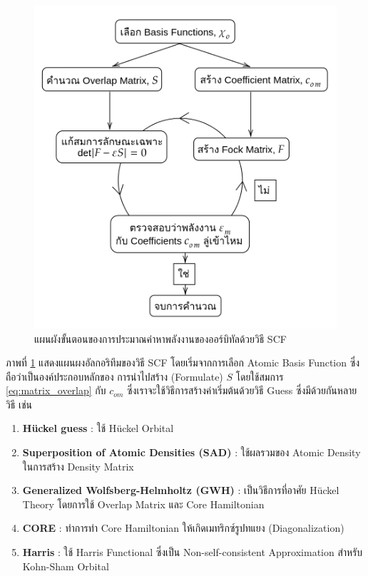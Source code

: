 \begin{figure}[htbp]
    \centering
    \includegraphics[width=0.9\linewidth]{fig/scf.png}
    \caption{แผนผังขั้นตอนของการประมาณค่าหาพลังงานของออร์บิทัลด้วยวิธี SCF}
    \label{fig:scf}
\end{figure}

ภาพที่ \ref{fig:scf} แสดงแผนผงอัลกอริทึมของวิธี SCF โดยเริ่มจากการเลือก Atomic Basis Function ซึ่งถือว่าเป็นองค์ประกอบหลักของ%
การนำไปสร้าง (Formulate) $S$ โดยใช้สมการ \ref{eq:matrix_overlap} กับ $c_{om}$ ซึ่งเราจะใช้วิธีการสร้างค่าเริ่มต้นด้วยวิธี Guess 
ซึ่งมีด้วยกันหลายวิธี เช่น

\begin{enumerate}[topsep=0pt]
    \item \textbf{H{\"u}ckel guess} : ใช้ H{\"u}ckel Orbital\autocite{jensen2017}
    
    \item \textbf{Superposition of Atomic Densities (SAD)} : ใช้ผลรวมของ Atomic Density ในการสร้าง Density Matrix
    
    \item \textbf{Generalized Wolfsberg-Helmholtz (GWH)} : เป็นวิธีการที่อาศัย H{\"u}ckel Theory โดยการใช้ Overlap 
    Matrix และ Core Hamiltonian\autocite{wolfsberg1952}
    
    \item \textbf{CORE} : ทำการทำ Core Hamiltonian ให้เกิดเมทริกซ์รูปทแยง (Diagonalization)
    
    \item \textbf{Harris} : ใช้ Harris Functional ซึ่งเป็น Non-self-consistent Approximation สำหรับ Kohn-Sham 
    Orbital\autocite{harris1985}
\end{enumerate}

